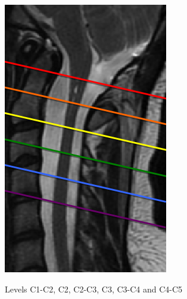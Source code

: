 \begin{figure}[!ht]
\begin{center}
\includegraphics[scale=0.6]{figures/Syrinx_Levels} \\
\caption{Levels C1-C2, C2, C2-C3, C3, C3-C4 and C4-C5}
\end{center}
\end{figure}
